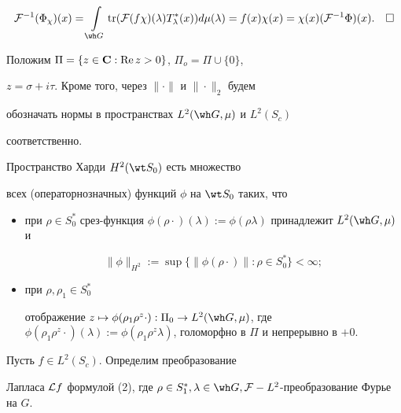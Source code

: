 $$


{\cal F}^{-1}(\Phi_\chi)(x) =


\int\limits_{\wh G}\tr({\cal F}(f\chi)(\lambda)T^*_\lambda(x))d\mu(\lambda) =


f(x)\chi(x) = \chi(x)({\cal F}^{-1}\Phi)(x).\quad\square


$$





Положим $\Pi = \{z\in {\bold C}:\operatorname{Re} z>0\}$, $\Pi_o = \Pi\cup \{0\}$,


$z = \sigma+i\tau$. Кроме того, через $\|\cdot\|$ и $\|\cdot\|_2$ будем


обозначать нормы в пространствах $L^2(\wh G,\mu)$ и $L^2(S_c)$


соответственно.





\begin{defn}


Пространство Харди $H^2(\wt S_0)$ есть множество


всех (операторнозначных) функций $\phi$ на $\wt S_0$ таких, что


\begin{itemize}


\item[1)] при $\rho\in S_0^*$ срез-функция $\phi(\rho\cdot)(\lambda) :=


\phi(\rho\lambda)$ принадлежит $L^2(\wh G,\mu)$ и


$$


\|\phi\|_{H^2} := \sup\{\|\phi(\rho\cdot)\|:\rho\in S^*_0\}<\infty;


$$


\item[2)] при $\rho,\rho_1\in S^*_0$


отображение $z\mapsto\phi(\rho_1\rho^z\cdot):


\Pi_0\to L^2(\wh G,\mu)$, где $\phi(\rho_1\rho^z\cdot)(\lambda) :=


\phi(\rho_1\rho^z\lambda)$, голоморфно в $\Pi$ и непрерывно в $+0$.


\end{itemize}


\end{defn}





\begin{defn}


Пусть $f\in L^2(S_c)$. Определим преобразование


Лапласа ${\cal L}f$ формулой (2), где $\rho\in S^*_1,\lambda\in \wh G,


{\cal F} - L^2$-преобразование Фурье на $G$.


\end{defn}





